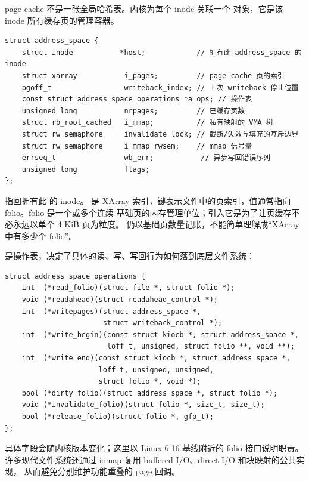 \begin{filesystemlayout}
page cache 不是一张全局哈希表。内核为每个 inode 关联一个  对象，它是该 inode 所有缓存页的管理容器。

\begin{lstlisting}
struct address_space {
    struct inode           *host;            // 拥有此 address_space 的 inode
    struct xarray           i_pages;         // page cache 页的索引
    pgoff_t                 writeback_index; // 上次 writeback 停止位置
    const struct address_space_operations *a_ops; // 操作表
    unsigned long           nrpages;         // 已缓存页数
    struct rb_root_cached   i_mmap;          // 私有映射的 VMA 树
    struct rw_semaphore     invalidate_lock; // 截断/失效与填充的互斥边界
    struct rw_semaphore     i_mmap_rwsem;    // mmap 信号量
    errseq_t                wb_err;           // 异步写回错误序列
    unsigned long           flags;
};
\end{lstlisting}

 指回拥有此  的 inode。 是
XArray 索引，键表示文件中的页索引，值通常指向 folio。folio 是一个或多个连续
基础页的内存管理单位；引入它是为了让页缓存不必永远以单个 4 KiB 页为粒度。
 仍以基础页数量记账，不能简单理解成“XArray 中有多少个 folio”。

 是操作表，决定了具体的读、写、写回行为如何落到底层文件系统：

\begin{lstlisting}
struct address_space_operations {
    int  (*read_folio)(struct file *, struct folio *);
    void (*readahead)(struct readahead_control *);
    int  (*writepages)(struct address_space *,
                       struct writeback_control *);
    int  (*write_begin)(const struct kiocb *, struct address_space *,
                        loff_t, unsigned, struct folio **, void **);
    int  (*write_end)(const struct kiocb *, struct address_space *,
                      loff_t, unsigned, unsigned,
                      struct folio *, void *);
    bool (*dirty_folio)(struct address_space *, struct folio *);
    void (*invalidate_folio)(struct folio *, size_t, size_t);
    bool (*release_folio)(struct folio *, gfp_t);
};
\end{lstlisting}

具体字段会随内核版本变化；这里以 Linux 6.16 基线附近的 folio 接口说明职责。
许多现代文件系统还通过 iomap 复用 buffered I/O、direct I/O 和块映射的公共实现，
从而避免分别维护功能重叠的 page 回调。



\end{filesystemlayout}
